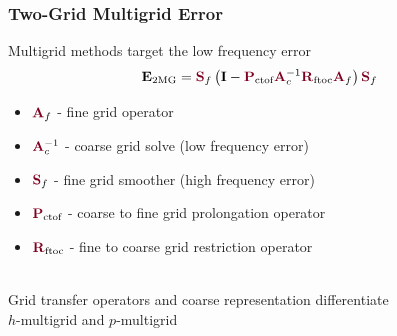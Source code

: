 \documentclass{beamer}
\begin{document}
\begin{frame}
\begin{center}
\frametitle{Two-Grid Multigrid Error}

Multigrid methods target the low frequency error\\

\begin{equation}
\mathbf{E}_{\text{2MG}} = {\color{burgundy}\mathbf{S}}_f \left( \mathbf{I} - {\color{burgundy}\mathbf{P}}_{\text{ctof}} {\color{burgundy}\mathbf{A}}_c^{-1} {\color{burgundy}\mathbf{R}}_{\text{ftoc}} {\color{burgundy}\mathbf{A}}_f \right) {\color{burgundy}\mathbf{S}}_f
\end{equation}

\begin{itemize}

\item ${\color{burgundy}\mathbf{A}}_f$ - fine grid operator

\item ${\color{burgundy}\mathbf{A}}_c^{-1}$ - coarse grid solve (low frequency error)

\item ${\color{burgundy}\mathbf{S}}_f$ - fine grid smoother (high frequency error)

\item ${\color{burgundy}\mathbf{P}}_{\text{ctof}}$ - coarse to fine grid prolongation operator

\item ${\color{burgundy}\mathbf{R}}_{\text{ftoc}}$ - fine to coarse grid restriction operator

\end{itemize}

~\\

Grid transfer operators and coarse representation differentiate\\$h$-multigrid and $p$-multigrid

\end{center}
\end{frame}

\end{document}
